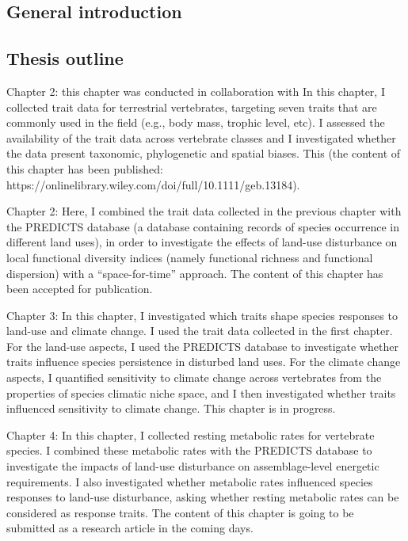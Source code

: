 \documentclass[11pt]{report}
\begin{document}
\begin{refsection}

\clearpage
\chapter{General introduction}
%


\section*{Thesis outline}

Chapter 2: this chapter was conducted in collaboration with 
In this chapter, I collected trait data for terrestrial vertebrates, targeting seven traits that are commonly used in the field (e.g., body mass, trophic level, etc). I assessed the availability of the trait data across vertebrate classes and I investigated whether the data present taxonomic, phylogenetic and spatial biases. This  (the content of this chapter has been published: https://onlinelibrary.wiley.com/doi/full/10.1111/geb.13184).

Chapter 2: Here, I combined the trait data collected in the previous chapter with the PREDICTS database (a database containing records of species occurrence in different land uses), in order to investigate the effects of land-use disturbance on local functional diversity indices (namely functional richness and functional dispersion) with a “space-for-time” approach. The content of this chapter has been accepted for publication. 

Chapter 3: In this chapter, I investigated which traits shape species responses to land-use and climate change. I used the trait data collected in the first chapter. For the land-use aspects, I used the PREDICTS database to investigate whether traits influence species persistence in disturbed land uses. For the climate change aspects, I quantified sensitivity to climate change across vertebrates from the properties of species climatic niche space, and I then investigated whether traits influenced sensitivity to climate change. This chapter is in progress.

Chapter 4: In this chapter, I collected resting metabolic rates for vertebrate species. I combined these metabolic rates with the PREDICTS database to investigate the impacts of land-use disturbance on assemblage-level energetic requirements. I also investigated whether metabolic rates influenced species responses to land-use disturbance, asking whether resting metabolic rates can be considered as response traits. The content of this chapter is going to be submitted as a research article in the coming days. 



\end{refsection}
\end{document}
